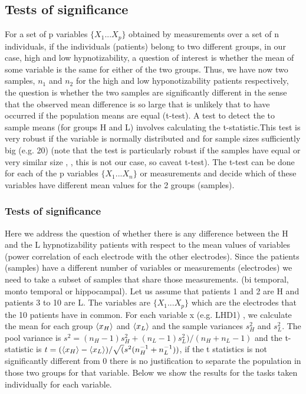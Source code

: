 \documentclass[11pt, onecolumn]{article}
\begin{document}
\subsection{Tests of significance}
For a set of p variables $\{X_1 ... X_p\}$ obtained by measurements over a set of n individuals, if the individuals (patients) belong to two different groups, in our case, high and low hypnotizability, a question of interest is whether the mean of some  variable is the same for either of the two groups. Thus, we have now two samples, $n_1$ and $n_2$ for the high and low hyponotizability patients respectively, the question is whether the two samples are significantly different in the sense that the observed mean difference is so large that is unlikely that to have occurred if the population means are equal (t-test). 
A test to detect the to sample means (for groups H and L) involves calculating the t-statistic.This test is very robust if the variable is normally distributed and for sample sizes sufficiently big (e.g. 20) (note that the test is particularly robust if the samples have equal or very similar size \citep{carter_effect_1979s},\citep{coombs_univariate_1996} , this is not our case, so caveat t-test). The t-test can be done for each of the p variables  $\{X_1 ... X_n\}$ or measurements and decide which of these variables have different mean values for the 2 groups (samples).

\subsubsection{Tests of significance}
Here we address the question of whether there is any difference
between the H and the L hypnotizability patients with respect to the mean values of variables (power correlation of each electrode with the other electrodes). Since the patients (samples) have a different number of variables or measurements (electrodes) we need to take a subset of samples that share those measurements. (bi temporal, monto temporal or hippocampal).
Let us assume that patients 1 and 2 are H and patients 3 to 10 are L. The variables are 
$\{X_1 ... X_p\}$ which are the electrodes that the 10 patients have in common.
For each variable x (e.g. LHD1)
, we calculate the mean for each group $\left< x_H \right>$ and $\left< x_L \right>$ and the sample variances $s^2_H$ and $s^2_L$. The pool variance is $s^2= (n_H-1)s^2_H + (n_L-1)s^2_L)/(n_H+n_L -1)$ and the t-statistic is $t= (\left< x_H \right> - \left< x_L \right>)/\sqrt(s^2(n_H^{-1} + n_L^{-1}))$, if the t statistics is not significantly different from 0 there is no justification to separate the population in those two groups for that variable. Below we show the results for the tasks taken individually for each variable.
\end{document}
